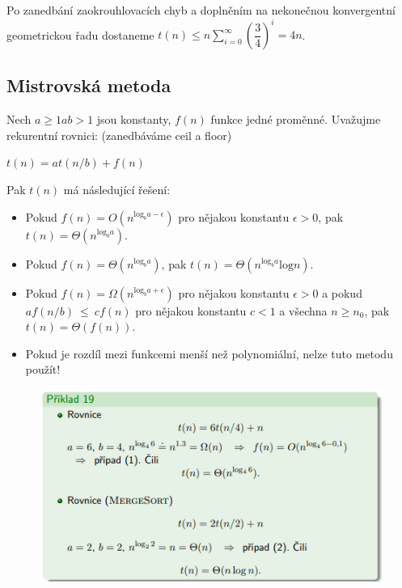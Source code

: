 \documentclass{szzclass}
\begin{document}
Po zanedbání zaokrouhlovacích chyb a doplněním na nekonečnou
konvergentní geometrickou řadu dostaneme
$t(n) \leq n \sum\limits_{i=0}^{\infty}(\dfrac{3}{4})^i= 4n$.






\subsection{Mistrovská metoda}

Nech $a \geq 1 a b > 1$ jsou konstanty, $f(n)$ funkce jedné proměnné.
Uvažujme rekurentní rovnici: (zanedbáváme ceil a floor)
\begin{center}
    $t(n) = at(n/b) + f(n)$ 
\end{center}

Pak $t(n)$ má následující řešení:
\begin{itemize}
    \item Pokud $f(n) = O(n^{\text{log}_b a - \epsilon} )$ pro nějakou konstantu $\epsilon > 0$, pak $t(n) = \Theta (n^{\text{log}_b a})$.
    \item Pokud $f(n) = \Theta (n^{\text{log}_b a})$, pak $t(n) = \Theta (n^{\text{log}_b a} \text{log} n)$.
    \item Pokud $f(n) = \Omega (n^{\text{log}_b a + \epsilon} )$ pro nějakou konstantu $\epsilon > 0$ a pokud
    $af(n/b)~\leq~cf(n)$ pro nějakou konstantu $c < 1$ a všechna $n \geq n_0$, pak $t(n) = \Theta (f(n))$.
    \item Pokud je rozdíl mezi funkcemi menší než polynomiální, nelze tuto metodu použít!
\end{itemize}



\begin{figure}
    \includegraphics[width=.8\textwidth, center]{topics/bi-spol-32/images/mt1.PNG}
\end{figure}
\end{document}
